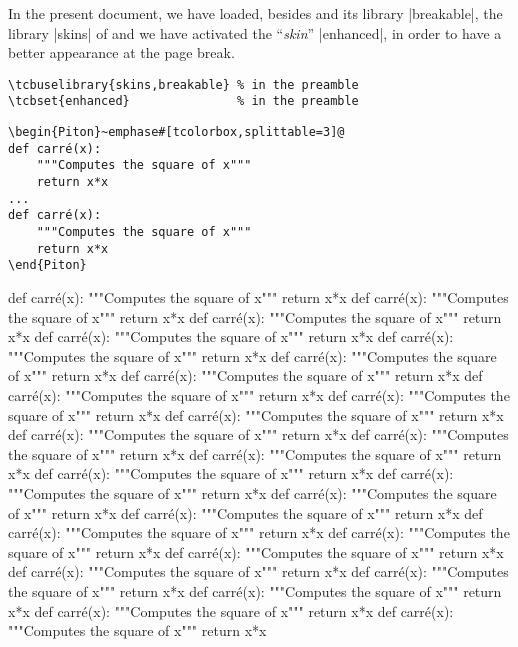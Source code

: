 \documentclass{article}
\begin{document}
\bigskip
In the present document, we have loaded, besides  and its library
|breakable|, the library |skins| of  and we have activated the
``\emph{skin}'' |enhanced|, in order to have a better appearance at the page break.


\begin{footnotesize}
\begin{Verbatim}
\tcbuselibrary{skins,breakable} % in the preamble
\tcbset{enhanced}               % in the preamble 
\end{Verbatim}
\end{footnotesize}

\begin{Verbatim}
\begin{Piton}~emphase#[tcolorbox,splittable=3]@
def carré(x):
    """Computes the square of x"""
    return x*x
...
def carré(x):
    """Computes the square of x"""
    return x*x
\end{Piton}
\end{Verbatim}

\begin{Piton}[tcolorbox,splittable=3]
def carré(x):
    """Computes the square of x"""
    return x*x
def carré(x):
    """Computes the square of x"""
    return x*x
def carré(x):
    """Computes the square of x"""
    return x*x
def carré(x):
    """Computes the square of x"""
    return x*x
def carré(x):
    """Computes the square of x"""
    return x*x
def carré(x):
    """Computes the square of x"""
    return x*x
def carré(x):
    """Computes the square of x"""
    return x*x
def carré(x):
    """Computes the square of x"""
    return x*x
def carré(x):
    """Computes the square of x"""
    return x*x
def carré(x):
    """Computes the square of x"""
    return x*x
def carré(x):
    """Computes the square of x"""
    return x*x
def carré(x):
    """Computes the square of x"""
    return x*x
def carré(x):
    """Computes the square of x"""
    return x*x
def carré(x):
    """Computes the square of x"""
    return x*x
def carré(x):
    """Computes the square of x"""
    return x*x
def carré(x):
    """Computes the square of x"""
    return x*x
def carré(x):
    """Computes the square of x"""
    return x*x
def carré(x):
    """Computes the square of x"""
    return x*x
def carré(x):
    """Computes the square of x"""
    return x*x
def carré(x):
    """Computes the square of x"""
    return x*x
def carré(x):
    """Computes the square of x"""
    return x*x
def carré(x):
    """Computes the square of x"""
    return x*x
def carré(x):
    """Computes the square of x"""
    return x*x
def carré(x):
    """Computes the square of x"""
    return x*x
def carré(x):
    """Computes the square of x"""
    return x*x
\end{Piton}
\end{document}
